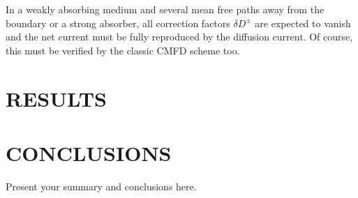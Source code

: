 \documentclass[letterpaper]{physor2020}
\newcommand{\eq}[1]{Eq.~(\ref{#1})}
\newcommand{\jp}{\ensuremath{J^+}}
\newcommand{\jm}{\ensuremath{J^-}}
\newcommand{\jpm}{\ensuremath{J^\pm}}
\newcommand{\jD}{\ensuremath{J^{\textrm{\scriptsize{D}}}}}
\newcommand{\hzi}{\ensuremath{\sfrac{1}{2}}}
\begin{document}

In a weakly absorbing medium and several mean free paths away from the boundary or a strong absorber, all correction factors $\delta D^\pm$ are expected to vanish and the net current must be fully reproduced by the diffusion current. Of course, this must be verified by the classic CMFD scheme too.


\section{RESULTS}
\label{sec:res}


\section{CONCLUSIONS}
\label{sec:conc}

Present your summary and conclusions here.
\end{document}

